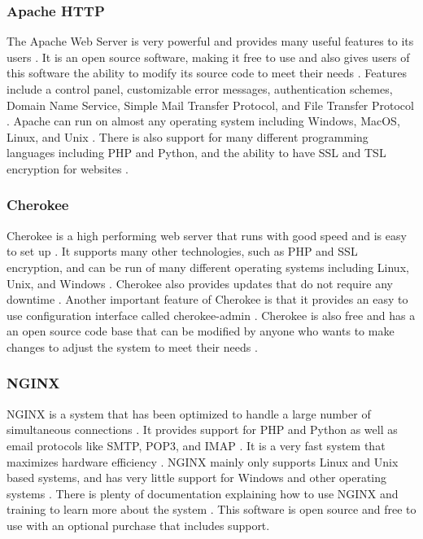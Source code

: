 \documentclass[onecolumn, draftclsnofoot,10pt, compsoc]{IEEEtran}
\begin{document}
\subsubsection{Apache HTTP}
The Apache Web Server is very powerful and provides many useful features to its users \cite{apache}. It is an open source software, making it free to use and also gives users of this software the ability to modify its source code to meet their needs \cite{apache}. Features include a control panel, customizable error messages, authentication schemes, Domain Name Service, Simple Mail Transfer Protocol, and File Transfer Protocol \cite{apache}. Apache can run on almost any operating system including Windows, MacOS, Linux, and Unix \cite{apache}. There is also support for many different programming languages including PHP and Python, and the ability to have SSL and TSL encryption for websites \cite{apache}.

\subsubsection{Cherokee}
Cherokee is a high performing web server that runs with good speed and is easy to set up \cite{cherokee}. It supports many other technologies, such as PHP and SSL encryption, and can be run of many different operating systems including Linux, Unix, and Windows \cite{cherokee}. Cherokee also provides updates that do not require any downtime \cite{cherokee}. Another important feature of Cherokee is that it provides an easy to use configuration interface called cherokee-admin \cite{cherokee}. Cherokee is also free and has a an open source code base that can be modified by anyone who wants to make changes to adjust the system to meet their needs \cite{cherokee}.

\subsubsection{NGINX}
NGINX is a system that has been optimized to handle a large number of simultaneous connections \cite{nginx}. It provides support for PHP and Python as well as email protocols like SMTP, POP3, and IMAP \cite{nginx}. It is a very fast system that maximizes hardware efficiency \cite{nginx}. NGINX mainly only supports Linux and Unix based systems, and has very little support for Windows and other operating systems \cite{nginx}. There is plenty of documentation explaining how to use NGINX and training to learn more about the system \cite{nginx}. This software is open source and free to use with an optional purchase that includes support.
\end{document}
